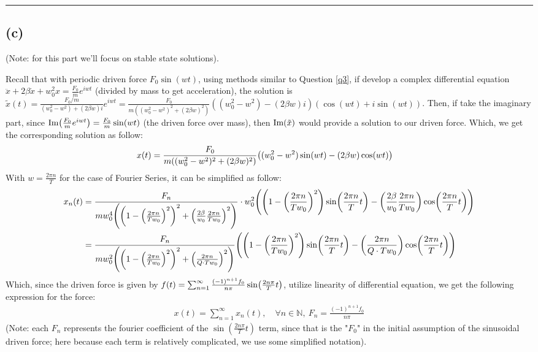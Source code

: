 \documentclass{article}
\newcommand{\NN}{\mathbb{N}}
\DeclarePairedDelimiter{\paran}{(}{)}%
\newcommand{\Imag}{\textmd{Im}} %
\begin{document}
\rule{15.24cm}{0.01mm}

\subsection*{(c)}
(Note: for this part we'll focus on stable state solutions).

Recall that with periodic driven force $F_0\sin(wt)$, using methods similar to Question \ref{q3}, if develop a complex differential equation $\ddot x+2\beta \dot x+w_0^2 x=\frac{F_0}{m}e^{iwt}$ (divided by mass to get acceleration), the solution is $\tilde{x}(t)=\frac{F_0/m}{(w_0^2-w^2)+(2\beta w)i}e^{iwt} = \frac{F_0}{m((w_0^2-w^2)^2+(2\beta w)^2)}((w_0^2-w^2)-(2\beta w)i)(\cos(wt)+i\sin(wt))$. Then, if take the imaginary part, since $\Imag\paran*{\frac{F_0}{m}e^{iwt}} = \frac{F_0}{m}\sin(wt)$ (the driven force over mass), then $\Imag(\tilde{x})$ would provide a solution to our driven force. Which, we get the corresponding solution as follow:
\begin{align}
    x(t) &= \frac{F_0}{m((w_0^2-w^2)^2+(2\beta w)^2)}\paran*{(w_0^2-w^2)\sin(wt)-(2\beta w)\cos(wt)}
\end{align}
With $w = \frac{2\pi n}{T}$ for the case of Fourier Series, it can be simplified as follow:
\begin{align}
    x_n(t)&=\frac{F_n}{mw_0^4\paran*{\paran*{1-\paran*{\frac{2\pi n}{Tw_0}}^2}^2+\paran*{\frac{2\beta}{w_0}\frac{2\pi n}{Tw_0}}^2}}\cdot w_0^2\paran*{\paran*{1-\paran*{\frac{2\pi n}{Tw_0}}^2}\sin\paran*{\frac{2\pi n}{T}t}-\paran*{\frac{2\beta}{w_0}\frac{2\pi n}{Tw_0}}\cos\paran*{\frac{2\pi n}{T}t}}\\
    &= \frac{F_n}{mw_0^2\paran*{\paran*{1-\paran*{\frac{2\pi n}{Tw_0}}^2}^2+\paran*{\frac{2\pi n}{Q\cdot Tw_0}}^2}}\paran*{\paran*{1-\paran*{\frac{2\pi n}{Tw_0}}^2}\sin\paran*{\frac{2\pi n}{T}t}-\paran*{\frac{2\pi n}{Q\cdot Tw_0}}\cos\paran*{\frac{2\pi n}{T}t}}
\end{align}
Which, since the driven force is given by $f(t) = \sum_{n=1}^{\infty}\frac{(-1)^{n+1}f_0}{n\pi}\sin\paran*{\frac{2n\pi}{T}t}$, utilize linearity of differential equation, we get the following expression for the force:
\begin{align}
    x(t)=\sum_{n=1}^{\infty}x_n(t),\quad \forall n\in \NN,\ F_n = \frac{(-1)^{n+1}f_0}{n\pi}
\end{align} 
(Note: each $F_n$ represents the fourier coefficient of the $\sin(\frac{2n\pi}{T}t)$ term, since that is the "$F_0$" in the initial assumption of the sinusoidal driven force; here because each term is relatively complicated, we use some simplified notation).
\end{document}
